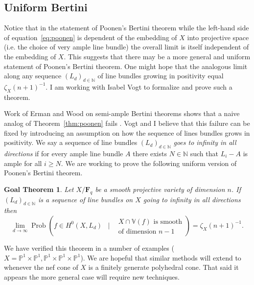 \documentclass[11pt,reqno]{amsart}
\newtheorem{goalTheorem}[lemma]{Goal Theorem}
\theoremstyle{remark}
\newcommand{\Prob}{\operatorname{Prob}}
\newcommand{\fF}{\mathbf F}
\newcommand{\N}{\mathbb{N}}
\renewcommand{\P}{\mathbb{P}}
\newcommand{\V}{\mathbb{V}}
\begin{document}
\subsection{Uniform Bertini}

Notice that in the statement of Poonen's Bertini theorem while the left-hand side of equation~\eqref{eq:poonen} is dependent of the embedding of $X$ into projective space (i.e. the choice of very ample line bundle) the overall limit is itself independent of the embedding of $X$. This suggests that there may be a more general and uniform statement of Poonen's Bertini theorem. One might hope that the analogous limit along any sequence $(L_{d})_{d\in\N}$ of line bundles growing in positivity equal $\zeta_{X}(n+1)^{-1}$. I am working with Isabel Vogt to formalize and prove such a theorem.

Work of Erman and Wood on semi-ample Bertini theorems shows that a naive analog of Theorem~\ref{thm:poonen} fails \cite{ermanWood15}. Vogt and I believe that this failure can be fixed by introducing an assumption on how the sequence of lines bundles grows in positivity. We say a sequence of line bundles  $\left(L_{d}\right)_{d\in\N}$ \textit{goes to infinity in all directions} if for every ample line bundle $A$ there exists $N\in \N$ such that $L_{i}-A$ is ample for all $i\geq N$. We are working to prove the following uniform version of Poonen's Bertini theorem.
 
\begin{goalTheorem}\label{gthm:effective-bertini}
Let $X/\fF_{q}$ be a smooth projective variety of dimension $n$. If $\left(L_{d}\right)_{d\in\N}$ is a sequence of line bundles on $X$ going to infinity in all directions then 
\begin{equation}
\lim_{d\to \infty} \Prob\left(f \in H^0\left(X, L_{d}\right)  \;\;\; \bigg| \;\;\; 
\begin{matrix}
 \text{$X\cap\V(f)$ is smooth}\\
 \text{of dimension $n-1$}
 \end{matrix}
\right)=
\zeta_X(n+1)^{-1}.
\end{equation}
\end{goalTheorem}

We have verified this theorem in a number of examples ($X=\P^1\times\P^1, \P^1\times\P^1\times\P^1$). We  are hopeful that similar methods will extend to whenever the nef cone of $X$ is a finitely generate polyhedral cone. That said it appears the more general case  will require new techniques. 
\end{document}
